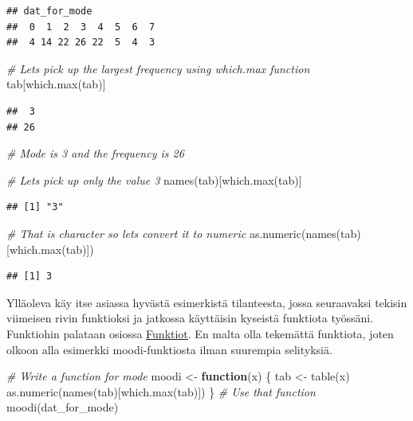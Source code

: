 \documentclass[
]{book}
\newenvironment{Shaded}{\begin{snugshade}}{\end{snugshade}}
\newcommand{\CommentTok}[1]{\textcolor[rgb]{0.56,0.35,0.01}{\textit{#1}}}
\newcommand{\ControlFlowTok}[1]{\textcolor[rgb]{0.13,0.29,0.53}{\textbf{#1}}}
\newcommand{\FunctionTok}[1]{\textcolor[rgb]{0.00,0.00,0.00}{#1}}
\newcommand{\NormalTok}[1]{#1}
\newcommand{\OtherTok}[1]{\textcolor[rgb]{0.56,0.35,0.01}{#1}}
\begin{document}
\begin{verbatim}
## dat_for_mode
##  0  1  2  3  4  5  6  7 
##  4 14 22 26 22  5  4  3
\end{verbatim}

\begin{Shaded}
\begin{Highlighting}[]
\CommentTok{\# Let\textquotesingle{}s pick up the largest frequency using which.max function}
\NormalTok{tab[}\FunctionTok{which.max}\NormalTok{(tab)]}
\end{Highlighting}
\end{Shaded}

\begin{verbatim}
##  3 
## 26
\end{verbatim}

\begin{Shaded}
\begin{Highlighting}[]
\CommentTok{\# Mode is 3 and the frequency is 26}

\CommentTok{\# Let\textquotesingle{}s pick up only the value 3}
\FunctionTok{names}\NormalTok{(tab)[}\FunctionTok{which.max}\NormalTok{(tab)]}
\end{Highlighting}
\end{Shaded}

\begin{verbatim}
## [1] "3"
\end{verbatim}

\begin{Shaded}
\begin{Highlighting}[]
\CommentTok{\# That is character so let\textquotesingle{}s convert it to numeric}
\FunctionTok{as.numeric}\NormalTok{(}\FunctionTok{names}\NormalTok{(tab)[}\FunctionTok{which.max}\NormalTok{(tab)])}
\end{Highlighting}
\end{Shaded}

\begin{verbatim}
## [1] 3
\end{verbatim}

Ylläoleva käy itse asiassa hyvästä esimerkistä tilanteesta, jossa seuraavaksi tekisin viimeisen rivin funktioksi ja jatkossa käyttäisin kyseistä funktiota työssäni. Funktiohin palataan osiossa \protect\hyperlink{functions}{Funktiot}. En malta olla tekemättä funktiota, joten olkoon alla esimerkki moodi-funktiosta ilman suurempia selityksiä.

\begin{Shaded}
\begin{Highlighting}[]
\CommentTok{\# Write a function for mode}
\NormalTok{moodi }\OtherTok{\textless{}{-}} \ControlFlowTok{function}\NormalTok{(x) \{}
\NormalTok{  tab }\OtherTok{\textless{}{-}} \FunctionTok{table}\NormalTok{(x)}
  \FunctionTok{as.numeric}\NormalTok{(}\FunctionTok{names}\NormalTok{(tab)[}\FunctionTok{which.max}\NormalTok{(tab)])}
\NormalTok{\}}
\CommentTok{\# Use that function}
\FunctionTok{moodi}\NormalTok{(dat\_for\_mode)}
\end{Highlighting}
\end{Shaded}
\end{document}
